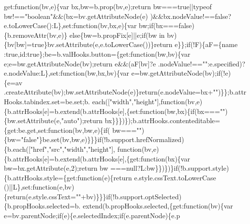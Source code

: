 \begin{DoxyCode}
{      get}:\textcolor{keyword}{function}(bv,e)\{var bx,bw=b.prop(bv,e);\textcolor{keywordflow}{return} bw===\textcolor{keyword}{true}||typeof bw!==\textcolor{stringliteral}{"boolean"}&&(bx=bv.getAttributeNode(e)
      )&&bx.nodeValue!==\textcolor{keyword}{false}?e.toLowerCase():L\},set:\textcolor{keyword}{function}(bv,bx,e)\{var bw;\textcolor{keywordflow}{if}(bx===\textcolor{keyword}{false})\{b.removeAttr(bv,e)\}\textcolor{keywordflow}{
      else}\{bw=b.propFix[e]||e;\textcolor{keywordflow}{if}(bw in bv)\{bv[bw]=\textcolor{keyword}{true}\}bv.setAttribute(e,e.toLowerCase())\}\textcolor{keywordflow}{return} e\}\};\textcolor{keywordflow}{if}(!F)\{aF=\{name
      :\textcolor{keyword}{true},\textcolor{keywordtype}{id}:\textcolor{keyword}{true}\};be=b.valHooks.button=\{\textcolor{keyword}{get}:\textcolor{keyword}{function}(bw,bv)\{var e;e=bw.getAttributeNode(bv);\textcolor{keywordflow}{return} e&&(aF[bv]?e
      .nodeValue!==\textcolor{stringliteral}{""}:e.specified)?e.nodeValue:L\},set:\textcolor{keyword}{function}(bw,bx,bv)\{var e=bw.getAttributeNode(bv);\textcolor{keywordflow}{if}(!e)\{e=av
      .createAttribute(bv);bw.setAttributeNode(e)\}\textcolor{keywordflow}{return}(e.nodeValue=bx+\textcolor{stringliteral}{""})\}\};b.attrHooks.tabindex.set=be.set;b.
      each([\textcolor{stringliteral}{"width"},\textcolor{stringliteral}{"height"}],\textcolor{keyword}{function}(bv,e)\{b.attrHooks[e]=b.extend(b.attrHooks[e],\{set:function(bw,bx)\{if(bx===\textcolor{stringliteral}{""})
      \{bw.setAttribute(e,\textcolor{stringliteral}{"auto"});return bx\}\}\})\});b.attrHooks.contenteditable=\{\textcolor{keyword}{get}:be.get,set:\textcolor{keyword}{function}(bv,bw,e)\{\textcolor{keywordflow}{if}(
      bw===\textcolor{stringliteral}{""})\{bw=\textcolor{stringliteral}{"false"}\}be.set(bv,bw,e)\}\}\}\textcolor{keywordflow}{if}(!b.support.hrefNormalized)\{b.each([\textcolor{stringliteral}{"href"},\textcolor{stringliteral}{"src"},\textcolor{stringliteral}{"width"},\textcolor{stringliteral}{"height"}],\textcolor{keyword}{
      function}(bv,e)\{b.attrHooks[e]=b.extend(b.attrHooks[e],\{get:function(bx)\{var bw=bx.getAttribute(e,2);return bw
      ===null?L:bw\}\})\})\}\textcolor{keywordflow}{if}(!b.support.style)\{b.attrHooks.style=\{\textcolor{keyword}{get}:\textcolor{keyword}{function}(e)\{\textcolor{keywordflow}{return} e.style.cssText.toLowerCase
      ()||L\},set:\textcolor{keyword}{function}(e,bv)\{\textcolor{keywordflow}{return}(e.style.cssText=\textcolor{stringliteral}{""}+bv)\}\}\}\textcolor{keywordflow}{if}(!b.support.optSelected)\{b.propHooks.selected=b.
      extend(b.propHooks.selected,\{get:function(bv)\{var e=bv.parentNode;if(e)\{e.selectedIndex;if(e.parentNode)\{e.p

\end{DoxyCode}
